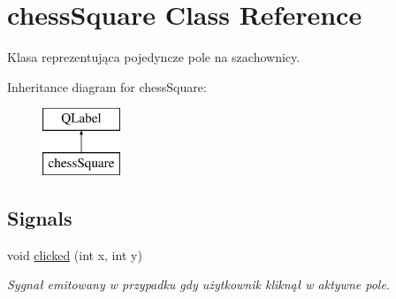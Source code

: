 \hypertarget{classchess_square}{}\section{chess\+Square Class Reference}
\label{classchess_square}


Klasa reprezentująca pojedyncze pole na szachownicy.  


Inheritance diagram for chess\+Square\+:\begin{figure}[H]
\begin{center}
\leavevmode
\includegraphics[height=2.000000cm]{classchess_square}
\end{center}
\end{figure}
\subsection*{Signals}
\begin{DoxyCompactItemize}
\item 
\mbox{\label{classchess_square_a3d79a4695b0bfa8415da18a7c82819c3}} 
void \hyperlink{classchess_square_a3d79a4695b0bfa8415da18a7c82819c3}{clicked} (int x, int y)
\begin{DoxyCompactList}\small\item\em Sygnał emitowany w przypadku gdy użytkownik kliknął w aktywne pole. \end{DoxyCompactList}\end{DoxyCompactItemize}
